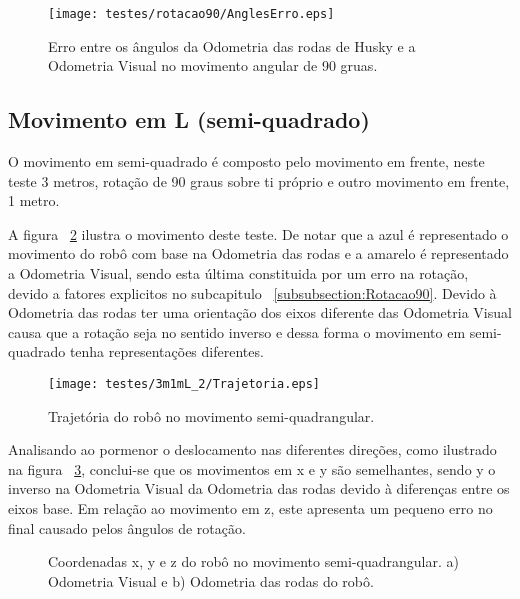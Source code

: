 \begin{figure}[h!]
	\begin{center}
		\leavevmode		
		\texttt{[image: testes/rotacao90/AnglesErro.eps]}
		\caption{Erro entre os ângulos da Odometria das rodas de Husky e a Odometria Visual no movimento angular de 90 gruas.}
		\label{fig:AnglesErro}
	\end{center}
\end{figure}



\FloatBarrier
\subsection{Movimento em L (semi-quadrado)}\label{subsubsection:L}


O movimento em semi-quadrado é composto pelo movimento em frente, neste teste 3 metros, rotação de 90 graus sobre ti próprio e outro movimento em frente, 1 metro.

A figura ~\ref{fig:trajRobo3m1mL_2} ilustra o movimento deste teste. De notar que a azul é representado o movimento do robô com base na Odometria das rodas e a amarelo é representado a Odometria Visual, sendo esta última constituida por um erro na rotação, devido a fatores explicitos no subcapitulo ~\ref{subsubsection:Rotacao90}. Devido à Odometria das rodas ter uma orientação dos eixos diferente das Odometria Visual causa que a rotação seja no sentido inverso e dessa forma o movimento em semi-quadrado tenha representações diferentes.

\pagebreak

\begin{figure}[h!]
	\begin{center}
		\leavevmode		
		\texttt{[image: testes/3m1mL\_2/Trajetoria.eps]}
		\caption{Trajetória do robô no movimento semi-quadrangular.}
		\label{fig:trajRobo3m1mL_2}
	\end{center}
\end{figure}



Analisando ao pormenor o deslocamento nas diferentes direções, como ilustrado na figura ~\ref{fig:pos3m1mL_2}, conclui-se que os movimentos em x e y são semelhantes, sendo y o inverso na Odometria Visual da Odometria das rodas devido à diferenças entre os eixos base. Em relação ao movimento em z, este apresenta um pequeno erro no final causado pelos ângulos de rotação.

\begin{figure}[h!]
	\centering
	\qquad
	\caption{Coordenadas x, y e z do robô  no movimento semi-quadrangular. a) Odometria Visual e b) Odometria das rodas do robô.}
	\label{fig:pos3m1mL_2}
\end{figure}


